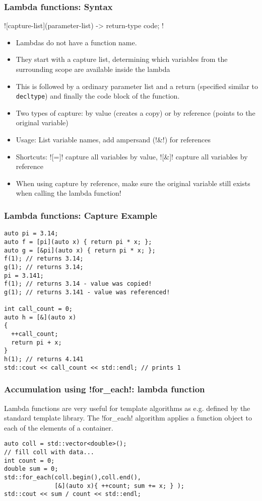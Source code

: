 \begin{frame}[fragile]
  \frametitle{Lambda functions: Syntax}
\inline![capture-list](parameter-list) -> return-type { code; }!
\vspace*{1em}
  \begin{itemize}
  \item Lambdas do not have a function name. 
  \item They start with a capture list, determining which variables from the surrounding scope are available inside the lambda
  \item This is followed by a ordinary parameter list and a return (specified similar to \lstinline!decltype!) and finally the code block of the function.
  \item Two types of capture: by value (creates a copy) or by reference (points to the original variable)
  \item Usage: List variable names, add ampersand (\inline!&!) for references
  \item Shortcuts: \inline![=]! capture all variables by value, \inline![&]! capture all variables by reference
  \item {} When using capture by reference, make sure the original variable still exists when calling the lambda function!
  \end{itemize}
\end{frame}

\begin{frame}[fragile]
\frametitle{Lambda functions: Capture Example}
\begin{lstlisting}
auto pi = 3.14;
auto f = [pi](auto x) { return pi * x; };
auto g = [&pi](auto x) { return pi * x; };
f(1); // returns 3.14;
g(1); // returns 3.14;
pi = 3.141;
f(1); // returns 3.14 - value was copied!
g(1); // returns 3.141 - value was referenced!

int call_count = 0;
auto h = [&](auto x) 
{
  ++call_count;
  return pi + x;
}
h(1); // returns 4.141
std::cout << call_count << std::endl; // prints 1
\end{lstlisting}

\end{frame}

\begin{frame}[fragile] \frametitle{Accumulation using
    \inline!for_each!: lambda function}

Lambda functions are very useful for template algorithms as e.g. defined by the standard template library. The \inline!for_each! algorithm applies a function object to each of the elements of a container.

\vspace*{2em}

  \begin{lstlisting}
auto coll = std::vector<double>();
// fill coll with data...
int count = 0;
double sum = 0;
std::for_each(coll.begin(),coll.end(),
              [&](auto x){ ++count; sum += x; } );
std::cout << sum / count << std::endl;
  \end{lstlisting}
\end{frame}



